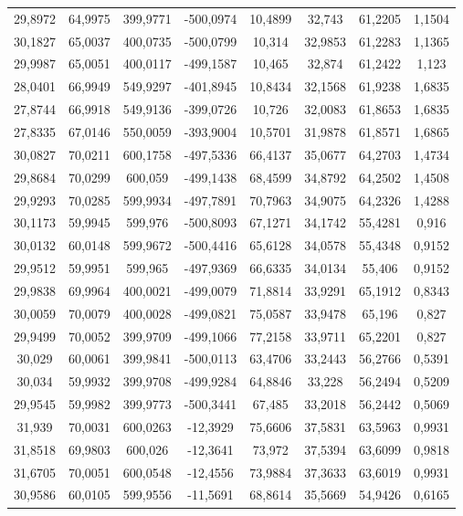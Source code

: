 \begin{longtable}{@{}cccccccc@{}}
29,8972 & 64,9975 & 399,9771 & -500,0974 & 10,4899 & 32,743 & 61,2205 & 1,1504 \\
30,1827 & 65,0037 & 400,0735 & -500,0799 & 10,314 & 32,9853 & 61,2283 & 1,1365 \\
29,9987 & 65,0051 & 400,0117 & -499,1587 & 10,465 & 32,874 & 61,2422 & 1,123 \\
28,0401 & 66,9949 & 549,9297 & -401,8945 & 10,8434 & 32,1568 & 61,9238 & 1,6835 \\
27,8744 & 66,9918 & 549,9136 & -399,0726 & 10,726 & 32,0083 & 61,8653 & 1,6835 \\
27,8335 & 67,0146 & 550,0059 & -393,9004 & 10,5701 & 31,9878 & 61,8571 & 1,6865 \\
30,0827 & 70,0211 & 600,1758 & -497,5336 & 66,4137 & 35,0677 & 64,2703 & 1,4734 \\
29,8684 & 70,0299 & 600,059 & -499,1438 & 68,4599 & 34,8792 & 64,2502 & 1,4508 \\
29,9293 & 70,0285 & 599,9934 & -497,7891 & 70,7963 & 34,9075 & 64,2326 & 1,4288 \\
30,1173 & 59,9945 & 599,976 & -500,8093 & 67,1271 & 34,1742 & 55,4281 & 0,916 \\
30,0132 & 60,0148 & 599,9672 & -500,4416 & 65,6128 & 34,0578 & 55,4348 & 0,9152 \\
29,9512 & 59,9951 & 599,965 & -497,9369 & 66,6335 & 34,0134 & 55,406 & 0,9152 \\
29,9838 & 69,9964 & 400,0021 & -499,0079 & 71,8814 & 33,9291 & 65,1912 & 0,8343 \\
30,0059 & 70,0079 & 400,0028 & -499,0821 & 75,0587 & 33,9478 & 65,196 & 0,827 \\
29,9499 & 70,0052 & 399,9709 & -499,1066 & 77,2158 & 33,9711 & 65,2201 & 0,827 \\
30,029 & 60,0061 & 399,9841 & -500,0113 & 63,4706 & 33,2443 & 56,2766 & 0,5391 \\
30,034 & 59,9932 & 399,9708 & -499,9284 & 64,8846 & 33,228 & 56,2494 & 0,5209 \\
29,9545 & 59,9982 & 399,9773 & -500,3441 & 67,485 & 33,2018 & 56,2442 & 0,5069 \\
31,939 & 70,0031 & 600,0263 & -12,3929 & 75,6606 & 37,5831 & 63,5963 & 0,9931 \\
31,8518 & 69,9803 & 600,026 & -12,3641 & 73,972 & 37,5394 & 63,6099 & 0,9818 \\
31,6705 & 70,0051 & 600,0548 & -12,4556 & 73,9884 & 37,3633 & 63,6019 & 0,9931 \\
30,9586 & 60,0105 & 599,9556 & -11,5691 & 68,8614 & 35,5669 & 54,9426 & 0,6165 \\

\end{longtable}
